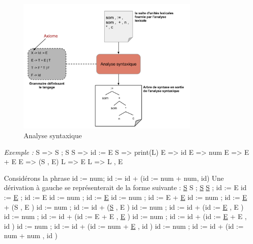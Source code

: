 \documentclass{article}
\begin{document}
\begin{figure}[h]
	\centering
		\includegraphics[width=0.80\textwidth]{AnalyseSyntaxique.png}
	\caption{Analyse syntaxique}
	\label{fig:AnalyseSyntaxique}
\end{figure}\FloatBarrier
\textit{Exemple :}\cite{refModernCompiler}
\label{ex:ModernCompiler}
\newline\newline
S => S ; S\newline
S => id := E\newline
S => print(L)\newline
E => id\newline
E => num\newline
E => E + E\newline
E => (S , E)\newline
L => E\newline
L => L , E\newline

Considérons la phrase id := num; id := id + (id := num + num, id)\newline
Une dérivation à gauche se représenterait de la forme suivante :\newline\newline
\underline{S}\newline
S ; \underline{S}\newline
\underline{S} ; id := E\newline
id := \underline{E} ; id := E\newline
id := num ; id := \underline{E}\newline
id := num ; id := E + \underline{E}\newline
id := num ; id := \underline{E} + (S , E )\newline
id := num ; id := id + (\underline{S} , E )\newline
id := num ; id := id + (id := \underline{E} , E )\newline
id := num ; id := id + (id := E + E , \underline{E} )\newline
id := num ; id := id + (id := \underline{E} + E , id )\newline
id := num ; id := id + (id := num + \underline{E} , id )\newline
id := num ; id := id + (id := num + num , id )\newline
\end{document}
